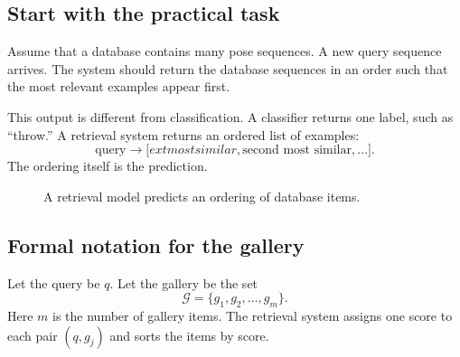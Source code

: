 \documentclass[11pt,oneside,openany]{book}
\theoremstyle{myplain}
\theoremstyle{definition}
\begin{document}
\subsection{Start with the practical task}

Assume that a database contains many pose sequences. A new query sequence arrives. The system should return the database sequences in an order such that the most relevant examples appear first.

This output is different from classification. A classifier returns one label, such as ``throw.'' A retrieval system returns an ordered list of examples:
\[
\text{query}\longrightarrow
\bigl[	ext{most similar},\text{second most similar},\ldots\bigr].
\]
The ordering itself is the prediction.

\begin{figure}[H]
\centering
{}
\caption{A retrieval model predicts an ordering of database items.}
\label{fig:retrieval}
\end{figure}

\subsection{Formal notation for the gallery}

Let the query be $q$. Let the gallery be the set
\[
  \mathcal G=\{g_1,g_2,\ldots,g_m\}.
\]
Here $m$ is the number of gallery items. The retrieval system assigns one score to each pair $(q,g_j)$ and sorts the items by score.
\end{document}
